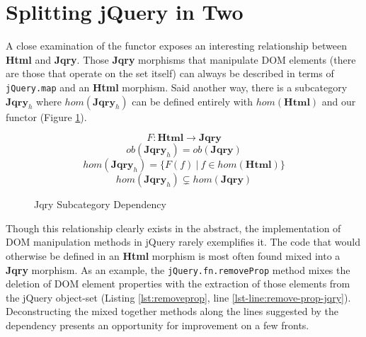 \documentclass[preprint, leqno]{sigplanconf}
\begin{document}
\section{Splitting jQuery in Two}

A close examination of the functor exposes an interesting relationship between \textbf{Html} and \textbf{Jqry}. Those \textbf{Jqry} morphisms that manipulate DOM elements (there are those that operate on the set itself) can always be described in terms of \verb|jQuery.map| and an \textbf{Html} morphism. Said another way, there is a subcategory \begin{math}\mathbf{Jqry}_{h}\end{math} where \begin{math}hom(\mathbf{Jqry}_{h})\end{math} can be defined entirely with \begin{math}hom(\mathbf{Html})\end{math} and our functor (Figure \ref{fig:dependent-sub-cat}).

\begin{figure}
\vspace{-10pt}
\begin{equation}
F : \mathbf{Html} \to \mathbf{Jqry}
\end{equation}
\vspace{-15pt}
\begin{equation}
ob(\mathbf{Jqry}_{h}) = ob(\mathbf{Jqry})
\end{equation}
\vspace{-15pt}
\begin{equation}
hom(\mathbf{Jqry}_{h}) = \{ F(f)\ |\ f \in hom(\mathbf{Html}) \}
\end{equation}
\vspace{-15pt}
\begin{equation}
hom(\mathbf{Jqry}_{h}) \subsetneq hom(\mathbf{Jqry})
\end{equation}
\vspace{-15pt}
\caption{Jqry Subcategory Dependency}
\vspace{-10pt}
\label{fig:dependent-sub-cat}
\end{figure}

Though this relationship clearly exists in the abstract, the implementation of DOM manipulation methods in jQuery rarely exemplifies it. The code that would otherwise be defined in an \textbf{Html} morphism is most often found mixed into a \textbf{Jqry} morphism. As an example, the \verb|jQuery.fn.removeProp| method mixes the deletion of DOM element properties with the extraction of those elements from the jQuery object-set (Listing \ref{lst:removeprop}, line \ref{lst-line:remove-prop-jqry}). Deconstructing the mixed together methods along the lines suggested by the dependency presents an opportunity for improvement on a few fronts.
\end{document}
